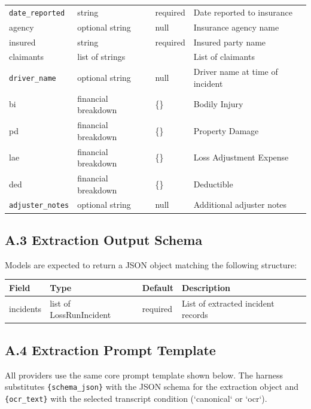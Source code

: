 \begin{longtable}{@{}>{\raggedright\arraybackslash}p{} >{\raggedright\arraybackslash}p{} >{\raggedright\arraybackslash}p{} >{\raggedright\arraybackslash}p{}@{}}
\texttt{date\_\allowbreak reported} & string & required & Date reported to insurance \\
agency & optional string & null & Insurance agency name \\
insured & string & required & Insured party name \\
claimants & list of strings & [] & List of claimants \\
\texttt{driver\_\allowbreak name} & optional string & null & Driver name at time of incident \\
bi & financial breakdown & \{\} & Bodily Injury \\
pd & financial breakdown & \{\} & Property Damage \\
lae & financial breakdown & \{\} & Loss Adjustment Expense \\
ded & financial breakdown & \{\} & Deductible \\
\texttt{adjuster\_\allowbreak notes} & optional string & null & Additional adjuster notes \\
\end{longtable}
\endgroup

\subsection*{A.3 Extraction Output Schema}

Models are expected to return a JSON object matching the following structure:

\begingroup
\small
\setlength{\tabcolsep}{3pt}
\renewcommand{\arraystretch}{1.15}
\begin{tabular}{@{}>{\raggedright\arraybackslash}p{} >{\raggedright\arraybackslash}p{} >{\raggedright\arraybackslash}p{} >{\raggedright\arraybackslash}p{}@{}}
\toprule
Field & Type & Default & Description \\
\midrule
incidents & list of LossRunIncident & required & List of extracted incident records \\
\bottomrule
\end{tabular}
\endgroup

\subsection*{A.4 Extraction Prompt Template}

All providers use the same core prompt template shown below. The harness substitutes \texttt{\{schema\_json\}} with the JSON schema for the extraction object and \texttt{\{ocr\_text\}} with the selected transcript condition (`canonical` or `ocr`).


